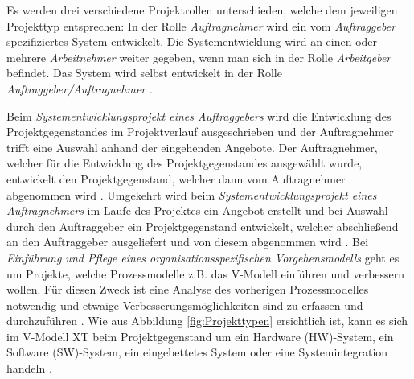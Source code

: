 Es werden drei verschiedene Projektrollen unterschieden, welche dem jeweiligen Projekttyp entsprechen: In der Rolle \textit{Auftragnehmer} wird ein vom \textit{Auftraggeber} spezifiziertes System entwickelt. Die Systementwicklung wird an einen oder mehrere \textit{Arbeitnehmer} weiter gegeben, wenn man sich in der Rolle \textit{Arbeitgeber} befindet. Das System  wird selbst entwickelt in der Rolle \textit{Auftraggeber/Auftragnehmer} \cite{brack2010,2004vmodell}.\newline


Beim \textit{Systementwicklungsprojekt eines Auftraggebers} wird die Entwicklung des Projektgegenstandes im Projektverlauf  ausgeschrieben und der Auftragnehmer trifft eine Auswahl anhand der eingehenden Angebote. Der Auftragnehmer, welcher für die Entwicklung des Projektgegenstandes ausgewählt wurde, entwickelt den Projektgegenstand, welcher dann vom Auftragnehmer abgenommen wird \cite{reinhard2008,2004vmodell}.\newline
Umgekehrt wird beim \textit{Systementwicklungsprojekt eines Auftragnehmers} im Laufe des Projektes ein Angebot erstellt und bei Auswahl durch den Auftraggeber ein Projektgegenstand entwickelt, welcher abschließend an den Auftraggeber ausgeliefert und von diesem abgenommen wird \cite{reinhard2008,2004vmodell}.\newline
Bei \textit{Einführung und Pflege eines organisationsspezifischen Vorgehensmodells} geht es um Projekte, welche Prozessmodelle z.B. das V-Modell einführen und verbessern wollen. Für diesen Zweck ist eine Analyse des vorherigen Prozessmodelles notwendig und etwaige Verbesserungsmöglichkeiten sind zu erfassen und durchzuführen \cite{reinhard2008,2004vmodell}.\newline
Wie aus Abbildung \ref{fig:Projekttypen} ersichtlich ist, kann es sich im V-Modell XT beim Projektgegenstand um ein Hardware (HW)-System, ein Software (SW)-System, ein eingebettetes System oder eine Systemintegration handeln \cite{brack2010,2004vmodell}. \newline

